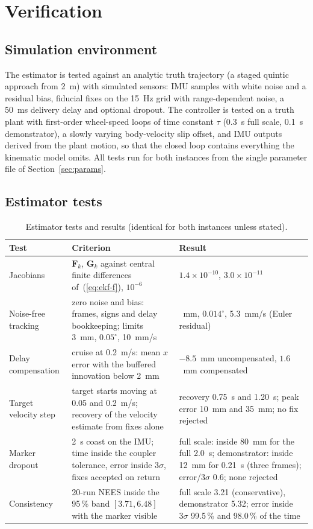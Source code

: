 \documentclass[11pt,a4paper]{article}
\newcommand{\mat}[1]{\bm{#1}}
\begin{document}
\section{Verification}
\label{sec:verif}

\subsection{Simulation environment}
The estimator is tested against an analytic truth trajectory (a staged quintic approach from 2~m) with simulated sensors: IMU samples with white noise and a residual bias, fiducial fixes on the 15~Hz grid with range-dependent noise, a 50~ms delivery delay and optional dropout. The controller is tested on a truth plant with first-order wheel-speed loops of time constant $\tau$ (0.3~s full scale, 0.1~s demonstrator), a slowly varying body-velocity slip offset, and IMU outputs derived from the plant motion, so that the closed loop contains everything the kinematic model omits. All tests run for both instances from the single parameter file of Section~\ref{sec:params}.

\subsection{Estimator tests}
\label{sec:ekf-tests}
\begin{table}[H]
\centering\small
\caption{Estimator tests and results (identical for both instances unless stated).}
\label{tab:ekf-tests}
\begin{tabularx}{\linewidth}{>{\raggedright\arraybackslash}p{3.4cm} X >{\raggedright\arraybackslash}p{5.2cm}}
\toprule
Test & Criterion & Result \\
\midrule
Jacobians & $\mat F_k$, $\mat G_k$ against central finite differences of~(\ref{eq:ekf-f}), $10^{-6}$ & $1.4\times10^{-10}$, $3.0\times10^{-11}$ \\
Noise-free tracking & zero noise and bias: frames, signs and delay bookkeeping; limits 3~mm, $0.05^\circ$, 10~mm/s & 0.90~mm, $0.014^\circ$, 5.3~mm/s (Euler residual) \\
Delay compensation & cruise at 0.2~m/s: mean $x$ error with the buffered innovation below 2~mm & $-8.5$~mm uncompensated, $1.6$~mm compensated \\
Target velocity step & target starts moving at 0.05 and 0.2~m/s; recovery of the velocity estimate from fixes alone & recovery 0.75~s and 1.20~s; peak error 10~mm and 35~mm; no fix rejected \\
Marker dropout & 2~s coast on the IMU; time inside the coupler tolerance, error inside $3\sigma$, fixes accepted on return & full scale: inside 80~mm for the full 2.0~s; demonstrator: inside 12~mm for 0.21~s (three frames); error/$3\sigma$ 0.6; none rejected \\
Consistency & 20-run NEES inside the 95\,\% band $[3.71, 6.48]$ with the marker visible & full scale 3.21 (conservative), demonstrator 5.32; error inside $3\sigma$ 99.5\,\% and 98.0\,\% of the time \\
\bottomrule
\end{tabularx}
\end{table}
\end{document}
